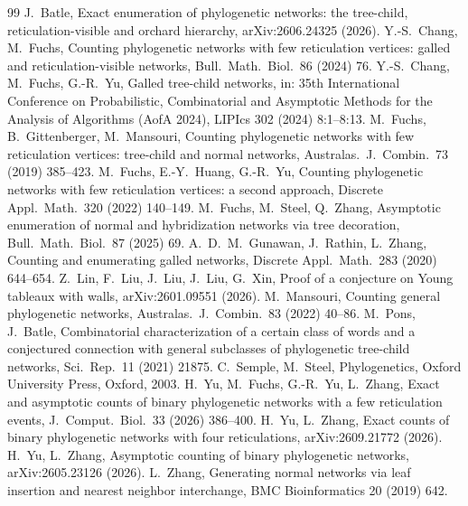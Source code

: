 \documentclass[11pt,a4paper]{article}
\theoremstyle{definition}
\begin{document}
\begin{thebibliography}{99}
 J.~Batle, Exact enumeration of phylogenetic networks: the tree-child, reticulation-visible and orchard hierarchy, arXiv:2606.24325 (2026).
 Y.-S.~Chang, M.~Fuchs, Counting phylogenetic networks with few reticulation vertices: galled and reticulation-visible networks, Bull.\ Math.\ Biol.\ 86 (2024) 76.
 Y.-S.~Chang, M.~Fuchs, G.-R.~Yu, Galled tree-child networks, in: 35th International Conference on Probabilistic, Combinatorial and Asymptotic Methods for the Analysis of Algorithms (AofA 2024), LIPIcs 302 (2024) 8:1--8:13.
 M.~Fuchs, B.~Gittenberger, M.~Mansouri, Counting phylogenetic networks with few reticulation vertices: tree-child and normal networks, Australas.\ J.\ Combin.\ 73 (2019) 385--423.
 M.~Fuchs, E.-Y.~Huang, G.-R.~Yu, Counting phylogenetic networks with few reticulation vertices: a second approach, Discrete Appl.\ Math.\ 320 (2022) 140--149.
 M.~Fuchs, M.~Steel, Q.~Zhang, Asymptotic enumeration of normal and hybridization networks via tree decoration, Bull.\ Math.\ Biol.\ 87 (2025) 69.
 A.~D.~M.~Gunawan, J.~Rathin, L.~Zhang, Counting and enumerating galled networks, Discrete Appl.\ Math.\ 283 (2020) 644--654.
 Z.~Lin, F.~Liu, J.~Liu, J.~Liu, G.~Xin, Proof of a conjecture on Young tableaux with walls, arXiv:2601.09551 (2026).
 M.~Mansouri, Counting general phylogenetic networks, Australas.\ J.\ Combin.\ 83 (2022) 40--86.
 M.~Pons, J.~Batle, Combinatorial characterization of a certain class of words and a conjectured connection with general subclasses of phylogenetic tree-child networks, Sci.\ Rep.\ 11 (2021) 21875.
 C.~Semple, M.~Steel, Phylogenetics, Oxford University Press, Oxford, 2003.
 H.~Yu, M.~Fuchs, G.-R.~Yu, L.~Zhang, Exact and asymptotic counts of binary phylogenetic networks with a few reticulation events, J.\ Comput.\ Biol.\ 33 (2026) 386--400.
 H.~Yu, L.~Zhang, Exact counts of binary phylogenetic networks with four reticulations, arXiv:2609.21772 (2026).
 H.~Yu, L.~Zhang, Asymptotic counting of binary phylogenetic networks, arXiv:2605.23126 (2026).
 L.~Zhang, Generating normal networks via leaf insertion and nearest neighbor interchange, BMC Bioinformatics 20 (2019) 642.
\end{thebibliography}
\end{document}

